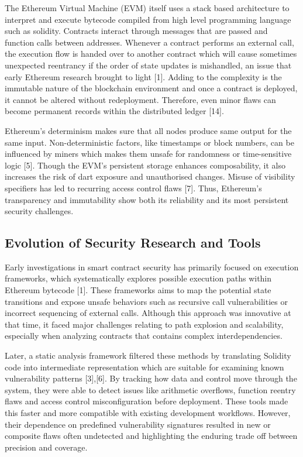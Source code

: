 \documentclass[conference]{IEEEtran}
\begin{document}
The Ethereum Virtual Machine (EVM) itself uses a stack based architecture to interpret and execute bytecode compiled from high level programming language such as solidity. Contracts interact through messages that are passed and function calls between addresses. Whenever a contract performs an external call, the execution flow is handed over to another contract which will cause sometimes unexpected reentrancy if the order of state updates is mishandled, an issue that early Ethereum research brought to light [1]. Adding to the complexity is the immutable nature of the blockchain environment and once a contract is deployed, it cannot be altered without redeployment. Therefore, even minor flaws can become permanent records within the distributed ledger [14].

Ethereum’s determinism makes sure that all nodes produce same output for the same input. Non-deterministic factors, like timestamps or block numbers, can be influenced by miners which makes them unsafe for randomness or time-sensitive logic [5]. Though the EVM’s persistent storage enhances composability, it also increases the risk of dart exposure and unauthorised changes. Misuse of visibility specifiers has led to recurring access control flaws [7]. Thus, Ethereum’s transparency and immutability show both its reliability and its most persistent security challenges.

\subsection{Evolution of Security Research and Tools} 
Early investigations in smart contract security has primarily focused on execution frameworks, which systematically explores possible execution paths within Ethereum bytecode [1]. These frameworks aims to map the potential state transitions and expose unsafe behaviors such as recursive call vulnerabilities or incorrect sequencing of external calls. Although this approach was innovative at that time, it faced major challenges relating to path explosion and scalability, especially when analyzing contracts that contains complex interdependencies. 

Later, a static analysis framework filtered these methods by translating Solidity code into intermediate representation which are suitable for examining known vulnerability patterns [3],[6]. By tracking how data and control move through the system, they were able to detect issues like arithmetic overflows, function reentry flaws and access control misconfiguration before deployment. These tools made this faster and more compatible with existing development workflows. However, their dependence on predefined vulnerability signatures resulted in new or composite flaws often undetected and highlighting the enduring trade off between precision and coverage. 
\end{document}
